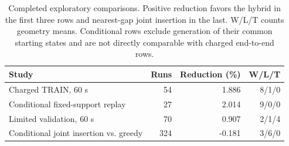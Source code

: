 \begin{table}[htbp]
\centering
\small
\begin{tabular}{lrrr}
\toprule
Study & Runs & Reduction (\%) & W/L/T \\
\midrule
Charged TRAIN, 60 s & 54 & 1.886 & 8/1/0 \\
Conditional fixed-support replay & 27 & 2.014 & 9/0/0 \\
Limited validation, 60 s & 70 & 0.907 & 2/1/4 \\
Conditional joint insertion vs. greedy & 324 & -0.181 & 3/6/0 \\
\bottomrule
\end{tabular}
\caption{Completed exploratory comparisons. Positive reduction favors the hybrid in the first three rows and nearest-gap joint insertion in the last. W/L/T counts geometry means. Conditional rows exclude generation of their common starting states and are not directly comparable with charged end-to-end rows.}
\label{tab:exploratory-complete}
\end{table}
